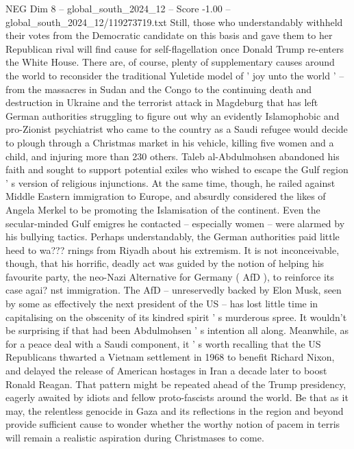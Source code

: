 \begin{textsample}{NEG Dim 8 – global\_south\_2024\_12 – Score -1.00 – global\_south\_2024\_12/119273719.txt}
Still, those who understandably withheld their votes from the Democratic candidate on this basis and gave them to her Republican rival will find cause for self-flagellation once Donald Trump re-enters the White House.
There are, of course, plenty of supplementary causes around the world to reconsider the traditional Yuletide model of ' joy unto the world ' -- from the massacres in Sudan and the Congo to the continuing death and destruction in Ukraine and the terrorist attack in Magdeburg that has left German authorities struggling to figure out why an evidently Islamophobic and pro-Zionist psychiatrist who came to the country as a Saudi refugee would decide to plough through a Christmas market in his vehicle, killing five women and a child, and injuring more than 230 others.
Taleb al-Abdulmohsen abandoned his faith and sought to support potential exiles who wished to escape the Gulf region ' s version of religious injunctions.
At the same time, though, he railed against Middle Eastern immigration to Europe, and absurdly considered the likes of Angela Merkel to be promoting the Islamisation of the continent.
Even the secular-minded Gulf emigres he contacted -- especially women -- were alarmed by his bullying tactics.
Perhaps understandably, the German authorities paid little heed to wa??? rnings from Riyadh about his extremism.
It is not inconceivable, though, that his horrific, deadly act was guided by the notion of helping his favourite party, the neo-Nazi Alternative for Germany ( AfD ), to reinforce its case agai? nst immigration.
The AfD -- unreservedly backed by Elon Musk, seen by some as effectively the next president of the US -- has lost little time in capitalising on the obscenity of its kindred spirit ' s murderous spree.
It wouldn't be surprising if that had been Abdulmohsen ' s intention all along.
Meanwhile, as for a peace deal with a Saudi component, it ' s worth recalling that the US Republicans thwarted a Vietnam settlement in 1968 to benefit Richard Nixon, and delayed the release of American hostages in Iran a decade later to boost Ronald Reagan.
That pattern might be repeated ahead of the Trump presidency, eagerly awaited by idiots and fellow proto-fascists around the world.
Be that as it may, the relentless genocide in Gaza and its reflections in the region and beyond provide sufficient cause to wonder whether the worthy notion of pacem in terris will remain a realistic aspiration during Christmases to come.

\end{textsample}
